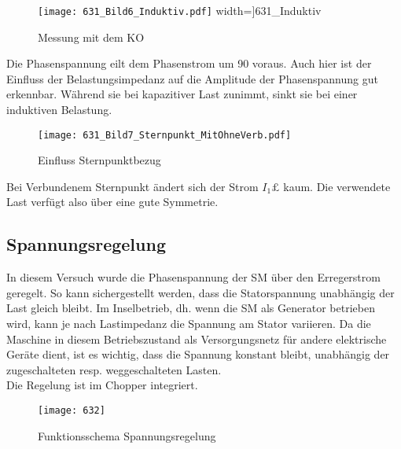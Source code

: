 \begin{flushleft}
\vspace{0.5cm}

\begin{figure}[H]
\centering
        \texttt{[image: 631\_Bild6\_Induktiv.pdf]}
				width=\textwidth]{631_Induktiv}
    \caption{Messung mit dem KO}
    \label{fig:abb1}
\end{figure}

Die Phasenspannung eilt dem Phasenstrom um 90 \degree voraus. Auch hier ist der Einfluss der Belastungsimpedanz auf die Amplitude der Phasenspannung gut erkennbar. Während sie bei kapazitiver Last zunimmt, sinkt sie bei einer induktiven Belastung. \\

\begin{figure}[H]
    \centering
        \texttt{[image: 631\_Bild7\_Sternpunkt\_MitOhneVerb.pdf]}
    \caption{Einfluss Sternpunktbezug}
    \label{fig:abb1}
\end{figure}
Bei Verbundenem Sternpunkt ändert sich der Strom $I_1£$ kaum. Die verwendete Last verfügt also über eine gute Symmetrie.




\newpage
\subsection{Spannungsregelung}

In diesem Versuch wurde die Phasenspannung der SM über den Erregerstrom geregelt. So kann sichergestellt werden, dass die Statorspannung unabhängig der Last gleich bleibt.
Im Inselbetrieb, dh. wenn die SM als Generator betrieben wird, kann je nach Lastimpedanz die Spannung am Stator variieren. Da die Maschine in diesem Betriebszustand als Versorgungsnetz für andere elektrische Geräte dient, ist es wichtig, dass die Spannung konstant bleibt, unabhängig der zugeschalteten resp. weggeschalteten Lasten.\\
Die Regelung ist im Chopper integriert. \\

\vspace{0.3cm}



\begin{figure}[H]
    \centering
        \texttt{[image: 632]}
    \caption{Funktionsschema Spannungsregelung}
    \label{fig:abb1}
\end{figure}




\end{flushleft}
